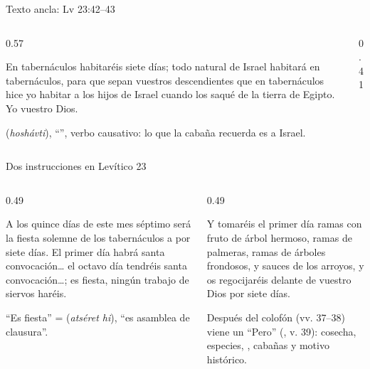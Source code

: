 \begin{frame}{Texto ancla: Lv 23:42--43}
\begin{columns}[c,onlytextwidth]
\begin{column}{0.57\textwidth}
\begin{cita}En tabernáculos habitaréis siete días; todo natural de Israel habitará en tabernáculos, para que sepan vuestros descendientes que en tabernáculos hice yo habitar a los hijos de Israel cuando los saqué de la tierra de Egipto. Yo \SENOR{} vuestro Dios.\end{cita}
\scriptsize {} (\emph{hoshávti}), ``'', verbo causativo: lo que la cabaña recuerda es  a Israel.
\end{column}
\begin{column}{0.41\textwidth}\end{column}
\end{columns}
\end{frame}

\begin{frame}{Dos instrucciones en Levítico 23}
\begin{columns}[t,onlytextwidth]
\begin{column}{0.49\textwidth}
\begin{cita}A los quince días de este mes séptimo será la fiesta solemne de los tabernáculos a \SENOR{} por siete días. El primer día habrá santa convocación\ldots{} el octavo día tendréis santa convocación\ldots; es fiesta, ningún trabajo de siervos haréis.\end{cita}
\scriptsize ``Es fiesta'' =  (\emph{atséret hi}), ``es asamblea de clausura''.
\end{column}
\begin{column}{0.49\textwidth}
\begin{cita}Y tomaréis el primer día ramas con fruto de árbol hermoso, ramas de palmeras, ramas de árboles frondosos, y sauces de los arroyos, y os regocijaréis delante de \SENOR{} vuestro Dios por siete días.\end{cita}
\scriptsize Después del colofón (vv. 37--38) viene un ``Pero'' (, v. 39): cosecha, especies, , cabañas y motivo histórico.
\end{column}
\end{columns}
\end{frame}

